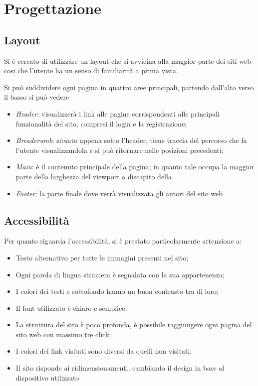 \section{Progettazione}

\subsection{Layout}

Si è cercato di utilizzare un layout che si avvicina alla maggior parte dei 
siti web cosi che l'utente ha un senso di familiarità a prima vista.

Si può suddividere ogni pagina in quattro aree principali, 
partendo dall'alto verso il basso si può vedere

\begin{itemize}
	\item \textit{Header}:  visualizzerà i link alle pagine
	corrispondenti alle principali funzionalità del sito, compresi il login e la registrazione;
	\item \textit{Breadcrumb}: situato appena sotto l'header, tiene traccia del 
	percorso che fa l'utente visualizzandola e si può ritornare nelle posizioni precedenti;
	\item \textit{Main}: è il contenuto principale della pagina; in quanto
	tale occupa la maggior parte della larghezza del viewport a discapito
	della
	\item \textit{Footer}: la parte finale dove verrà visualizzata gli autori del sito web
\end{itemize}

\subsection{Accessibilità}

Per quanto riguarda l'accessibilità, si è prestato particolarmente attenzione a:

\begin{itemize}
	\item Testo alternativo per tutte le immagini presenti nel sito;
	\item Ogni parola di lingua straniera è segnalata con la sua appartenenza;
	\item I colori dei testi e sottofondo hanno un buon contrasto tra di loro;
	\item Il font utilizzato è chiaro e semplice;
	\item La struttura del sito è poco profonda, è possibile raggiungere ogni pagina
	del sito web con massimo tre click;
	\item I colori dei link visitati sono diversi da quelli non visitati;
	\item Il sito risponde ai ridimensionamenti, cambiando il design in base al dispositivo utilizzato
\end{itemize}